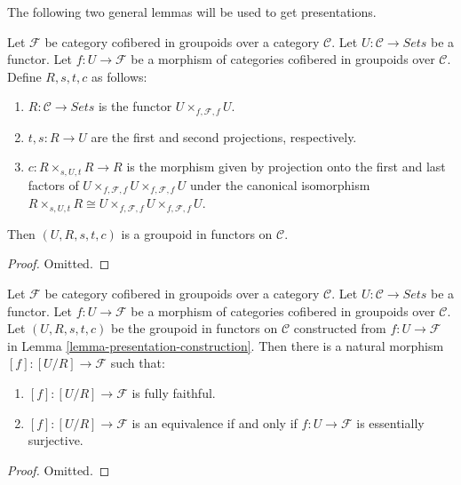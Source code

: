 \noindent
The following two general lemmas will be used to get presentations.

\begin{lemma}
\label{lemma-presentation-construction}
Let $\mathcal{F}$ be category cofibered in groupoids over a category $\mathcal 
C$.  Let $U: \mathcal{C} \to \textit{Sets}$ be a functor. Let $f: 
U \to \mathcal{F}$ be a morphism of categories cofibered in groupoids 
over $\mathcal{C}$. Define $R,s,t,c$ as follows:
\begin{enumerate}
\item $R: \mathcal{C} \to \textit{Sets}$ is the functor $U 
\times_{f,\mathcal{F},f} U$.
\item $t,s: R \to U$ are the first and second projections, 
respectively. 
\item $c: R \times_{s,U,t} R \to R$ is the morphism given by projection 
onto the first and last factors of $U \times_{f, \mathcal{F}, f} U 
\times_{f,\mathcal{F},f} U$ under the canonical isomorphism $R \times_{s,U,t} R 
\cong U \times_{f, \mathcal{F}, f} U \times_{f,\mathcal{F},f} U$.
\end{enumerate}
Then $(U,R,s,t,c)$ is a groupoid in functors on $\mathcal{C}$.
\end{lemma}

\begin{proof}
Omitted.
\end{proof}

\begin{lemma}
\label{lemma-presentation-morphism}
Let $\mathcal{F}$ be category cofibered in groupoids over a category $\mathcal 
C$.  Let $U: \mathcal{C} \to \textit{Sets}$ be a functor. Let $f: 
U \to \mathcal{F}$ be a morphism of categories cofibered in groupoids 
over $\mathcal{C}$. Let $(U,R,s,t,c)$ be the groupoid in functors on $\mathcal 
C$ constructed from $f: U \to \mathcal{F}$ in Lemma 
\ref{lemma-presentation-construction}.  Then there is a natural morphism $[f]: 
[U/R] \to \mathcal{F}$ such that:
\begin{enumerate}
\item $[f]: [U/R] \to \mathcal{F}$ is fully faithful.
\item $[f]: [U/R] \to \mathcal{F}$ is an equivalence if and only if $f: 
U \to \mathcal{F}$ is essentially surjective.
\end{enumerate}
\end{lemma}

\begin{proof}
Omitted.
\end{proof}

